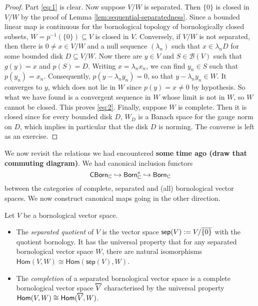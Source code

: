\begin{proof}
Part \ref{eq:1} is clear. Now suppose \(V/W\) is separated. Then \(\{0\}\) is closed in \(V/W\) by the proof of Lemma \ref{lem:sequential-separatedness}. Since a bounded linear map is continuous for the bornological topology of bornologically closed subsets, \(W = p^{-1}(\{0\}) \subseteq V\) is closed in \(V\). Conversely, if \(V/W\) is not separated, then there is \(0 \neq x \in V/W\) and a null sequence \((\lambda_n)\) such that \(x \in \lambda_n D\) for some bounded disk \(D \subseteq V/W\). Now there are \(y \in V\) and \(S \in \mathcal{B}(V)\) such that \(g(y) = x\) and \(p(S) = D\). Writing \(x = \lambda_n x_n\), we can find \(y_n \in S\) such that \(p(y_n) = x_n\). Consequently, \(p(y - \lambda_n y_n) = 0\), so that \(y - \lambda_n y_n \in W\). It converges to \(y\), which does not lie in \(W\) since \(p(y) = x \neq 0\) by hypothesis. So what we have found is a convergent sequence in \(W\) whose limit is not in \(W\), so \(W\) cannot be closed. This proves \ref{eq:2}. Finally,  suppose \(W\) is complete. Then it is closed since for every bounded disk \(D\), \(W_D\) is a Banach space for the gauge norm on \(D\), which implies in particular that the disk \(D\) is norming. The converse is left as an exercise. 
\end{proof}


We now revisit the relations we had encountered \textbf{some time ago (draw that commuting diagram)}. We had canonical inclusion functors \[\mathsf{CBorn}_{\mathbb C} \hookrightarrow \mathsf{Born}_{\mathbb C}^s \hookrightarrow \mathsf{Born}_\mathbb C\] between the categories of complete, separated and (all) bornological vector spaces. We now construct canonical maps going in the other direction.

\begin{definition}\label{def:completion-separated}
Let \(V\) be a bornological vector space. 
\begin{itemize}
    \item The \textit{separated quotient} of \(V\) is the vector space \(\mathsf{sep}(V) \mathrel{:=} V/\overline{\{0\}}\) with the quotient bornology. It has the universal property that for any separated bornological vector space \(W\), there are natural isomorphisms \(\mathsf{Hom}(V,W) \cong \mathsf{Hom}(\mathsf{sep}(V), W)\).
    \item The \textit{completion} of a separated bornological vector space is a complete bornological vector space \(\comb{V}\)  characterised by the universal property \(\mathsf{Hom}(V,W) \cong \mathsf{Hom}(\comb{V},W)\).
\end{itemize}
\end{definition}

